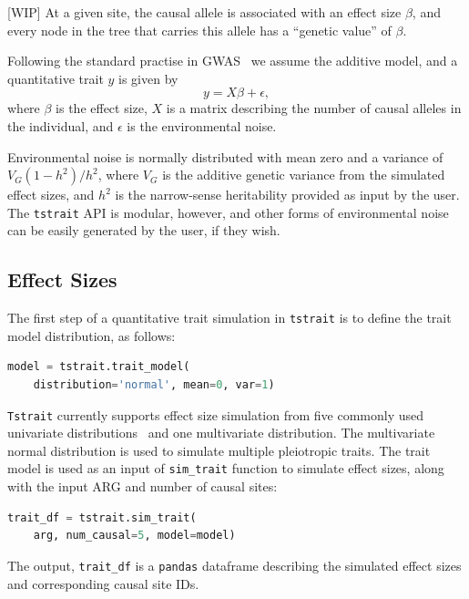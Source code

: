 \documentclass[unnumsec,webpdf,modern,large,namedate]{oup-authoring-template}%
\begin{document}
[WIP]
At a given site, the causal allele is associated with an
effect size $\beta$,
and every node in the tree that carries this allele has a
``genetic value'' of $\beta$.

Following the standard practise in GWAS~\citep{uffelmann2021}
we assume the additive model, and a quantitative trait $y$
is given by
\[
y=X\beta+\epsilon,
\]
where $\beta$ is the effect size, $X$ is a matrix describing the number
of causal alleles in the individual, and $\epsilon$ is the environmental
noise.

Environmental noise is normally distributed with mean zero
and a variance of $V_G(1-h^2)/{h^2}$,
where $V_G$ is the additive genetic variance from the simulated effect sizes,
and $h^2$ is the narrow-sense heritability provided as input by the user.
The \texttt{tstrait} API is modular, however, and other forms of environmental
noise can be easily generated by the user, if they wish.

\subsection{Effect Sizes}
The first step of a quantitative trait simulation in \texttt{tstrait} is to
define the trait model distribution, as follows:
\begin{lstlisting}[language=Python]
model = tstrait.trait_model(
    distribution='normal', mean=0, var=1)
\end{lstlisting}
\texttt{Tstrait} currently supports effect size simulation from five
commonly used univariate distributions~\citep{gaynor2021,haller2023}
and one multivariate distribution.
The multivariate normal distribution is used to simulate multiple
pleiotropic traits.
The trait model is used as an input of \texttt{sim\_trait} function to simulate
effect sizes, along with the input ARG and number of causal sites:
\begin{lstlisting}[language=Python]
trait_df = tstrait.sim_trait(
    arg, num_causal=5, model=model)
\end{lstlisting}
The output, \texttt{trait\_df} is a \texttt{pandas} dataframe
describing the simulated effect sizes and corresponding
causal site IDs.
\end{document}
